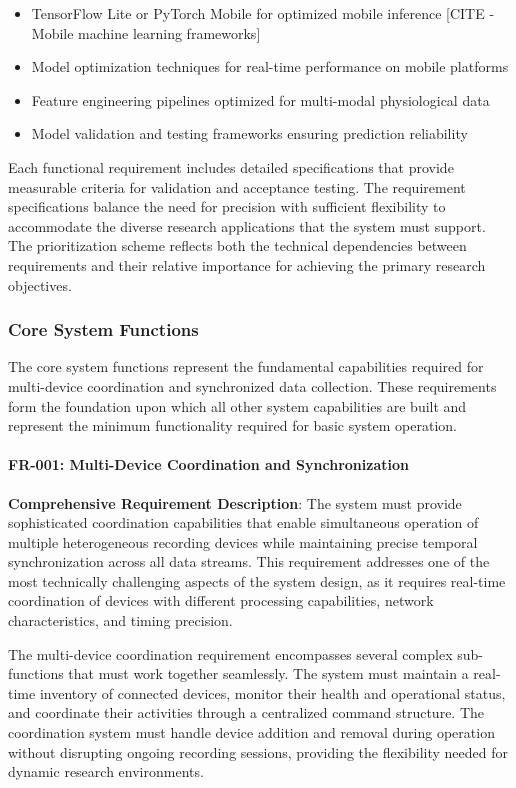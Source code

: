 \documentclass[11pt,a4paper]{report}
\begin{document}
\begin{itemize}
\item TensorFlow Lite or PyTorch Mobile for optimized mobile inference [CITE - Mobile machine learning frameworks]
\item Model optimization techniques for real-time performance on mobile platforms
\item Feature engineering pipelines optimized for multi-modal physiological data
\item Model validation and testing frameworks ensuring prediction reliability

\end{itemize}
Each functional requirement includes detailed specifications that provide measurable criteria for validation and
acceptance testing. The requirement specifications balance the need for precision with sufficient flexibility to
accommodate the diverse research applications that the system must support. The prioritization scheme reflects both the
technical dependencies between requirements and their relative importance for achieving the primary research objectives.

\subsubsection{Core System Functions}

The core system functions represent the fundamental capabilities required for multi-device coordination and synchronized
data collection. These requirements form the foundation upon which all other system capabilities are built and represent
the minimum functionality required for basic system operation.

\paragraph{FR-001: Multi-Device Coordination and Synchronization}

\textbf{Comprehensive Requirement Description}: The system must provide sophisticated coordination capabilities that enable
simultaneous operation of multiple heterogeneous recording devices while maintaining precise temporal synchronization
across all data streams. This requirement addresses one of the most technically challenging aspects of the system
design, as it requires real-time coordination of devices with different processing capabilities, network
characteristics, and timing precision.

The multi-device coordination requirement encompasses several complex sub-functions that must work together seamlessly.
The system must maintain a real-time inventory of connected devices, monitor their health and operational status, and
coordinate their activities through a centralized command structure. The coordination system must handle device addition
and removal during operation without disrupting ongoing recording sessions, providing the flexibility needed for dynamic
research environments.
\end{document}
